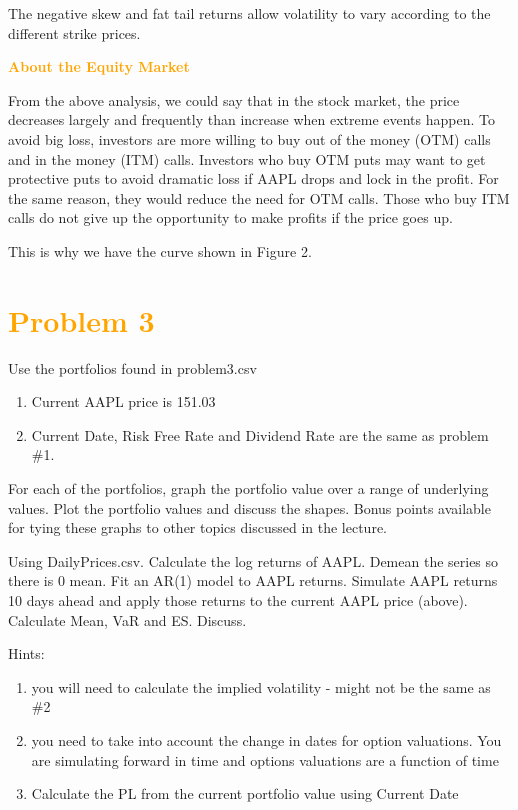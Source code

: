 \documentclass[11pt,en]{elegantpaper}
\begin{document}
The negative skew and fat tail returns allow volatility to vary according to the different strike prices. 

\textcolor{orange}{\textbf{About the Equity Market}}

From the above analysis, we could say that in the stock market, the price decreases largely and frequently than increase when extreme events happen. To avoid big loss, investors are more willing to buy out of the money (OTM) calls and in the money (ITM) calls.
Investors who buy OTM puts may want to get protective puts to avoid dramatic loss if AAPL drops and lock in the profit. For the same reason, they would reduce the need for OTM calls. Those who buy ITM calls do not give up the opportunity to make profits if the price goes up. 

This is why we have the curve shown in Figure 2.

\section*{\textcolor{orange}{Problem 3}}

Use the portfolios found in problem3.csv
\begin{enumerate}
    \item Current AAPL price is 151.03
    \item Current Date, Risk Free Rate and Dividend Rate are the same as problem \#1.
\end{enumerate}

For each of the portfolios, graph the portfolio value over a range of underlying values. Plot the portfolio values and discuss the shapes. Bonus points available for tying these graphs to other topics discussed in the lecture.

Using DailyPrices.csv. Calculate the log returns of AAPL. Demean the series so there is 0 mean. Fit an AR(1) model to AAPL returns. Simulate AAPL returns 10 days ahead and apply those returns to the current AAPL price (above). Calculate Mean, VaR and ES. Discuss.

Hints:
\begin{enumerate}
    \item you will need to calculate the implied volatility - might not be the same as \#2
    \item you need to take into account the change in dates for option valuations. You are simulating forward in time and options valuations are a function of time
    \item Calculate the PL from the current portfolio value using Current Date
\end{enumerate}
\end{document}
